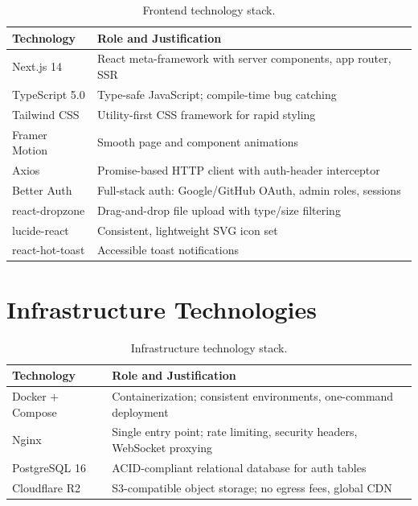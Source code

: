 \documentclass[12pt, a4paper]{report}
\begin{document}
\begin{table}[H]
\centering
\begin{tabularx}{\textwidth}{l X}
\toprule
\textbf{Technology} & \textbf{Role and Justification} \\
\midrule
Next.js 14 & React meta-framework with server components, app router, SSR \\
TypeScript 5.0 & Type-safe JavaScript; compile-time bug catching \\
Tailwind CSS & Utility-first CSS framework for rapid styling \\
Framer Motion & Smooth page and component animations \\
Axios & Promise-based HTTP client with auth-header interceptor \\
Better Auth & Full-stack auth: Google/GitHub OAuth, admin roles, sessions \\
react-dropzone & Drag-and-drop file upload with type/size filtering \\
lucide-react & Consistent, lightweight SVG icon set \\
react-hot-toast & Accessible toast notifications \\
\bottomrule
\end{tabularx}
\caption{Frontend technology stack.}
\end{table}

\section{Infrastructure Technologies}

\begin{table}[H]
\centering
\begin{tabularx}{\textwidth}{l X}
\toprule
\textbf{Technology} & \textbf{Role and Justification} \\
\midrule
Docker + Compose & Containerization; consistent environments, one-command deployment \\
Nginx & Single entry point; rate limiting, security headers, WebSocket proxying \\
PostgreSQL 16 & ACID-compliant relational database for auth tables \\
Cloudflare R2 & S3-compatible object storage; no egress fees, global CDN \\
\bottomrule
\end{tabularx}
\caption{Infrastructure technology stack.}
\end{table}


\end{document}
